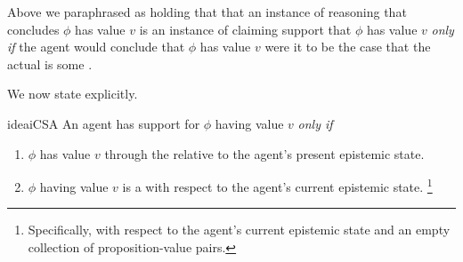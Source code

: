 \begin{note}
  Above we paraphrased \ideaS{} as holding that that an instance of reasoning that concludes \(\phi\) has value \(v\) is an instance of claiming support that \(\phi\) has value \(v\) \emph{only if} the agent would conclude that \(\phi\) has value \(v\) were it to be the case that the actual \world{} is some \epPAd{} \world{}.

  We now state \ideaS{} explicitly.
\end{note}

\begin{note}
  \begin{restatable}{idea}{iCSA}
    \label{idea:defs-for-CS}
    An agent \vAgent{} has support for \(\phi\) having value \(v\) \emph{only if}
    \begin{enumerate}
    \item
      \(\phi\) has value \(v\) through the  relative to the agent's present epistemic state.
    \item
    \(\phi\) having value \(v\) is a \sink{} with respect to the agent's current epistemic state.\nolinebreak
    \footnote{Specifically, with respect to the agent's current epistemic state and an empty collection of proposition-value pairs.}
  \end{enumerate}
\end{restatable}
\end{note}

